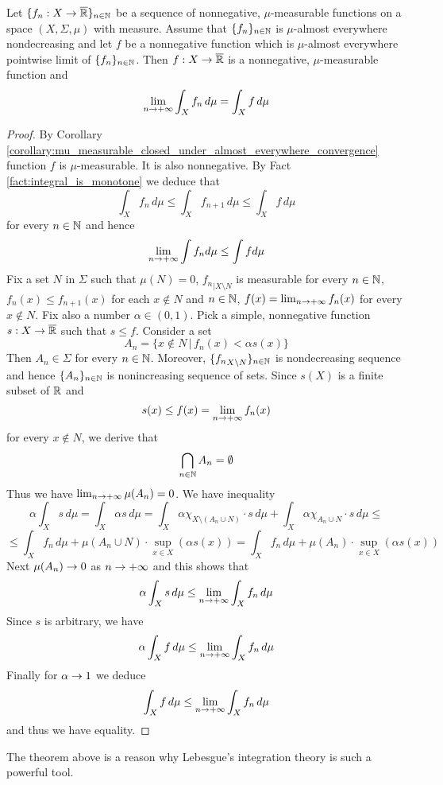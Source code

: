 \begin{theorem}\label{theorem:monotone_convergence}
Let $\{f_n:X\rightarrow \overline{{\mathbb R}}\}_{n\in {\mathbb N}}$ be a sequence of nonnegative, $\mu$-measurable functions on a space $(X,\Sigma,\mu)$ with measure. Assume that $\{f_n\}_{n\in {\mathbb N}}$ is $\mu$-almost everywhere nondecreasing and let $f$ be a nonnegative function which is $\mu$-almost everywhere pointwise limit of $\{f_n\}_{n\in {\mathbb N}}$. Then $f:X\rightarrow \overline{{\mathbb R}}$ is a nonnegative, $\mu$-measurable function and
$$\lim_{n\rightarrow +\infty}\int_X f_n\, d\mu = \int_X f\, d\mu$$
\end{theorem}
\begin{proof}
By Corollary \ref{corollary:mu_measurable_closed_under_almost_everywhere_convergence} function $f$ is $\mu$-measurable. It is also nonnegative. By Fact \ref{fact:integral_is_monotone} we deduce that
$$\int_X f_n\,d\mu \leq \int_X f_{n+1}\,d\mu \leq \int_X f\, d\mu$$
for every $n\in {\mathbb N}$ and hence 
$$\lim_{n\rightarrow +\infty}\int f_n d\mu \leq \int f d\mu$$
Fix a set $N$ in $\Sigma$ such that $\mu(N) = 0$, ${f_n}_{\mid X\setminus N}$ is measurable for every $n\in {\mathbb N}$, $f_n(x)\leq f_{n+1}(x)$ for each $x\not \in N$ and $n\in {\mathbb N}$, $f(x) = \lim_{n\rightarrow +\infty}f_n(x)$ for every $x\not \in N$. Fix also a number $\alpha \in (0,1)$. Pick a simple, nonnegative function $s:X\rightarrow \overline{{\mathbb R}}$ such that $s\leq f$. Consider a set
$$A_n = \big\{x\not \in N\,\big|\, f_n(x)< \alpha s(x)\big\}$$
Then $A_n\in \Sigma$ for every $n\in {\mathbb N}$. Moreover, $\{{f_n}_{X\setminus N}\}_{n\in {\mathbb N}}$ is nondecreasing sequence and hence $\{A_n\}_{n\in {\mathbb N}}$ is nonincreasing sequence of sets. Since $s(X)$ is a finite subset of ${\mathbb R}$ and
$$s(x)\leq f(x) = \lim_{n\rightarrow +\infty}f_n(x)$$
for every $x\not \in N$, we derive that
$$\bigcap_{n\in {\mathbb N}}A_n = \emptyset$$
Thus we have $\lim_{n\rightarrow +\infty}\mu(A_n)=0$. We have inequality
$$\alpha  \int_Xs\,d\mu = \int_X\alpha s\,d\mu = \int_X \alpha \chi_{X\setminus \left(A_n\cup N\right)}\cdot s\,d\mu +  \int_X \alpha \chi_{A_n\cup N}\cdot s\,d\mu \leq $$
$$\leq \int_X f_n\,d\mu + \mu(A_n\cup N)\cdot \sup_{x\in X}\left(\alpha s(x)\right) = \int_X f_n\,d\mu + \mu(A_n)\cdot \sup_{x\in X}\left(\alpha s(x)\right)$$
Next $\mu(A_n)\rightarrow 0$ as $n\rightarrow +\infty$ and this shows that
$$\alpha  \int_Xs\,d\mu \leq \lim_{n\rightarrow +\infty}\int_Xf_n\,d\mu$$
Since $s$ is arbitrary, we have
$$\alpha  \int_Xf\,d\mu \leq \lim_{n\rightarrow +\infty}\int_Xf_n\,d\mu$$
Finally for $\alpha \rightarrow 1$ we deduce
$$\int_Xf\,d\mu \leq  \lim_{n\rightarrow +\infty}\int_Xf_n\,d\mu$$
and thus we have equality.
\end{proof}
\noindent
The theorem above is a reason why Lebesgue's integration theory is such a powerful tool.

